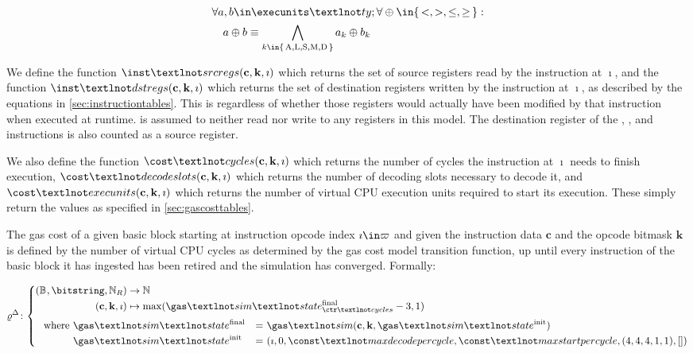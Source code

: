 \begin{equation}
\begin{aligned}
  &\forall a,b \in \execunits¬ty;\forall \oplus \in \set{<, >, \le, \ge}: \\
  &\quad a \oplus b \equiv \bigwedge_{k \in \set{\ALU, \LOAD, \STORE, \MUL, \DIV}} a_k \oplus b_k
\end{aligned}
\end{equation}

We define the function $\inst¬srcregs(\mathbf{c}, \mathbf{k}, \imath)$ which returns the set of source registers read by the instruction at $\imath$, and the function $\inst¬dstregs(\mathbf{c}, \mathbf{k}, \imath)$ which returns the set of destination registers written by the instruction at $\imath$, as described by the equations in \ref{sec:instructiontables}. This is regardless of whether those registers would actually have been modified by that instruction when executed at runtime.  is assumed to neither read nor write to any registers in this model. The destination register of the , ,  and  instructions is also counted as a source register.

We also define the function $\cost¬cycles(\mathbf{c}, \mathbf{k}, \imath)$ which returns the number of cycles the instruction at $\imath$ needs to finish execution, $\cost¬decodeslots(\mathbf{c}, \mathbf{k}, \imath)$ which returns the number of decoding slots necessary to decode it, and $\cost¬execunits(\mathbf{c}, \mathbf{k}, \imath)$ which returns the number of virtual CPU execution units required to start its execution. These simply return the values as specified in \ref{sec:gascosttables}.

The gas cost of a given basic block starting at instruction opcode index $\imath \in \basicblocks$ and given the instruction data $\mathbf{c}$ and the opcode bitmask $\mathbf{k}$ is defined by the number of virtual CPU cycles as determined by the gas cost model transition function, up until every instruction of the basic block it has ingested has been retired and the simulation has converged. Formally:

\begin{equation}\label{eq:gascostforblock}
  \gascostforblock\colon \abracegrouptwo{
    \tup{\blob, \bitstring, \pvmreg} &\to \N\\
    \tup{\mathbf{c}, \mathbf{k}, \imath} &\mapsto \max(\gas¬sim¬state^{\text{final}}_{\ctr¬cycles} - 3, 1)\\
  }{
    \where &\gas¬sim¬state^{\text{final}} &=&\text{ }\gas¬sim(\mathbf{c}, \mathbf{k}, \gas¬sim¬state^{\text{init}})\\
      &\gas¬sim¬state^{\text{init}} &=&\text{ }\tup{\imath, 0, \const¬maxdecodepercycle, \const¬maxstartpercycle, \tup{4, 4, 4, 1, 1}, \sq{}}
  }
\end{equation}

